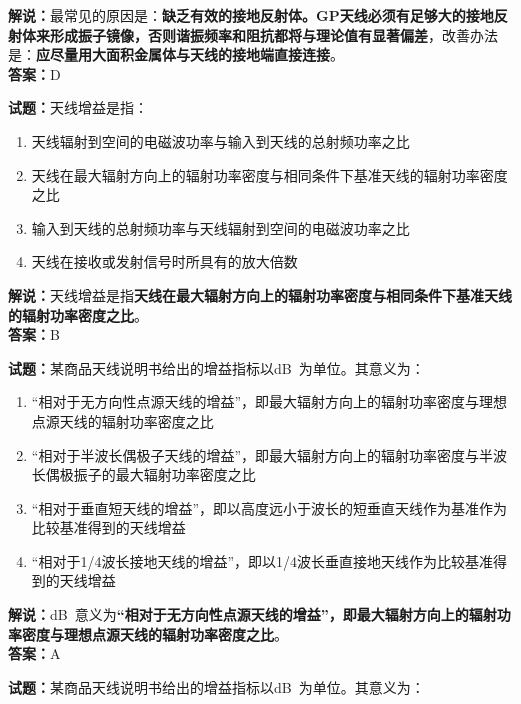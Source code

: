 \documentclass{ctexbook}
\begin{document}
\noindent\textbf{解说：}最常见的原因是：\textbf{缺乏有效的接地反射体。GP天线必须有足够大的接地反射体来形成振子镜像，否则谐振频率和阻抗都将与理论值有显著偏差}，改善办法是：\textbf{应尽量用大面积金属体与天线的接地端直接连接}。\\\noindent\textbf{答案：}D

\bigskip

\noindent\textbf{试题：}天线增益是指：

\begin{enumerate}[leftmargin=3em]
  \item 天线辐射到空间的电磁波功率与输入到天线的总射频功率之比
  \item 天线在最大辐射方向上的辐射功率密度与相同条件下基准天线的辐射功率密度之比
  \item 输入到天线的总射频功率与天线辐射到空间的电磁波功率之比
  \item 天线在接收或发射信号时所具有的放大倍数
\end{enumerate}

\noindent\textbf{解说：}天线增益是指\textbf{天线在最大辐射方向上的辐射功率密度与相同条件下基准天线的辐射功率密度之比}。\\\noindent\textbf{答案：}B

\bigskip

\noindent\textbf{试题：}某商品天线说明书给出的增益指标以\unit[qualifier-mode=combine]{\deci\bel{}}为单位。其意义为：
\begin{enumerate}[leftmargin=3em]
  \item “相对于无方向性点源天线的增益”，即最大辐射方向上的辐射功率密度与理想点源天线的辐射功率密度之比
  \item “相对于半波长偶极子天线的增益”，即最大辐射方向上的辐射功率密度与半波长偶极振子的最大辐射功率密度之比
  \item “相对于垂直短天线的增益”，即以高度远小于波长的短垂直天线作为基准作为比较基准得到的天线增益
  \item “相对于1/4波长接地天线的增益”，即以1/4波长垂直接地天线作为比较基准得到的天线增益
\end{enumerate}

\noindent\textbf{解说：}\unit[qualifier-mode=combine]{\deci\bel{}}意义为\textbf{“相对于无方向性点源天线的增益”，即最大辐射方向上的辐射功率密度与理想点源天线的辐射功率密度之比}。\\\noindent\textbf{答案：}A

\bigskip

\noindent\textbf{试题：}某商品天线说明书给出的增益指标以\unit[qualifier-mode=combine]{\deci\bel{}}为单位。其意义为：
\end{document}
